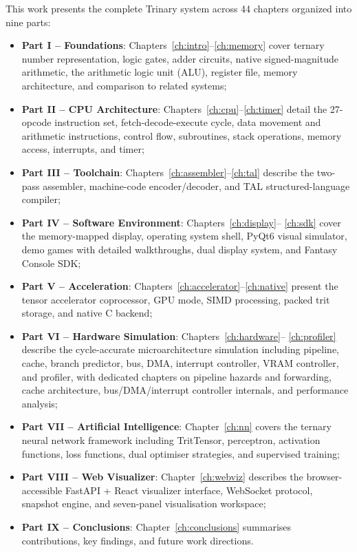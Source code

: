 \documentclass[12pt,a4paper,twoside]{book}
\theoremstyle{trinarytheorem}
\theoremstyle{trinarydefinition}
\begin{document}
This work presents the complete Trinary system across 44 chapters organized into nine
parts:
\begin{itemize}
    \item \textbf{Part I -- Foundations}: Chapters~\ref{ch:intro}--\ref{ch:memory}
          cover ternary number representation, logic gates, adder circuits, native
          signed-magnitude arithmetic, the arithmetic logic unit (ALU), register file, memory
          architecture, and comparison to related systems;
    \item \textbf{Part II -- CPU Architecture}: Chapters~\ref{ch:cpu}--\ref{ch:timer}
          detail the 27-opcode instruction set, fetch-decode-execute cycle, data
          movement and arithmetic instructions, control flow, subroutines, stack
          operations, memory access, interrupts, and timer;
    \item \textbf{Part III -- Toolchain}: Chapters~\ref{ch:assembler}--\ref{ch:tal}
          describe the two-pass assembler, machine-code encoder/decoder, and TAL
          structured-language compiler;
    \item \textbf{Part IV -- Software Environment}: Chapters~\ref{ch:display}--
          \ref{ch:sdk} cover the memory-mapped display, operating system shell, PyQt6
          visual simulator, demo games with detailed walkthroughs, dual display system,
          and Fantasy Console SDK;
    \item \textbf{Part V -- Acceleration}: Chapters~\ref{ch:accelerator}--\ref{ch:native}
          present the tensor accelerator coprocessor, GPU mode, SIMD processing, packed
          trit storage, and native C backend;
    \item \textbf{Part VI -- Hardware Simulation}: Chapters~\ref{ch:hardware}--
          \ref{ch:profiler} describe the cycle-accurate microarchitecture simulation
          including pipeline, cache, branch predictor, bus, DMA, interrupt controller,
          VRAM controller, and profiler, with dedicated chapters on pipeline hazards
          and forwarding, cache architecture, bus/DMA/interrupt controller internals,
          and performance analysis;
    \item \textbf{Part VII -- Artificial Intelligence}: Chapter~\ref{ch:nn} covers
          the ternary neural network framework including TritTensor, perceptron,
          activation functions, loss functions, dual optimiser strategies, and
          supervised training;
    \item \textbf{Part VIII -- Web Visualizer}: Chapter~\ref{ch:webviz} describes
          the browser-accessible FastAPI + React visualizer interface, WebSocket
          protocol, snapshot engine, and seven-panel visualisation workspace;
    \item \textbf{Part IX -- Conclusions}: Chapter~\ref{ch:conclusions} summarises
          contributions, key findings, and future work directions.
\end{itemize}
\end{document}
